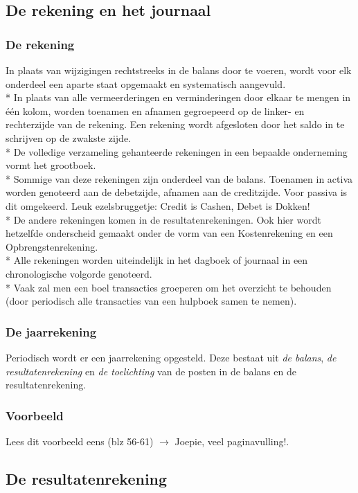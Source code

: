 \documentclass[12pt]{article}
\begin{document}
\subsection{De rekening en het journaal}
\subsubsection{De rekening}
In plaats van wijzigingen rechtstreeks in de balans door te voeren, wordt voor elk onderdeel een aparte staat opgemaakt en systematisch aangevuld.\\*
In plaats van alle vermeerderingen en verminderingen door elkaar te mengen in \'e\'en kolom, worden toenamen en afnamen gegroepeerd op de linker- en rechterzijde van de rekening. Een rekening wordt afgesloten door het saldo in te schrijven op de zwakste zijde.\\*
De volledige verzameling gehanteerde rekeningen in een bepaalde onderneming vormt het grootboek.\\*
Sommige van deze rekeningen zijn onderdeel van de balans. Toenamen in activa worden genoteerd aan de debetzijde, afnamen aan de creditzijde. Voor passiva is dit omgekeerd. Leuk ezelsbruggetje: Credit is Cashen, Debet is Dokken!\\*
De andere rekeningen komen in de resultatenrekeningen. Ook hier wordt hetzelfde onderscheid gemaakt onder de vorm van een Kostenrekening en een Opbrengstenrekening.\\*
Alle rekeningen worden uiteindelijk in het dagboek of journaal in een chronologische volgorde genoteerd.\\*
Vaak zal men een boel transacties groeperen om het overzicht te behouden (door periodisch alle transacties van een hulpboek samen te nemen).
\subsubsection{De jaarrekening}
Periodisch wordt er een jaarrekening opgesteld. Deze bestaat uit \textit{de balans}, \textit{de resultatenrekening} en \textit{de toelichting} van de posten in de balans en de resultatenrekening.
\subsubsection{Voorbeeld}
Lees dit voorbeeld eens (blz 56-61) $\rightarrow$ Joepie, veel paginavulling!.
\subsection{De resultatenrekening}
\end{document}
